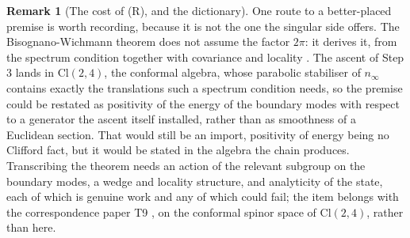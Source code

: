\documentclass[11pt]{article}
\theoremstyle{definition}
\newtheorem{remark}[theorem]{Remark}
\theoremstyle{plain}
\providecommand{\Cl}{}\renewcommand{\Cl}{\mathrm{Cl}}
\providecommand{\nInf}{}\renewcommand{\nInf}{n_\infty}
\begin{document}
\begin{remark}[The cost of (R), and the dictionary]
One route to a better-placed premise is worth recording, because it is not the one the singular side offers. The Bisognano-Wichmann theorem does not assume the factor $2\pi$: it derives it, from the spectrum condition together with covariance and locality \cite{BW1976, Sewell1982}. The ascent of Step 3 lands in $\Cl(2,4)$, the conformal algebra, whose parabolic stabiliser of $\nInf$ contains exactly the translations such a spectrum condition needs, so the premise could be restated as positivity of the energy of the boundary modes with respect to a generator the ascent itself installed, rather than as smoothness of a Euclidean section. That would still be an import, positivity of energy being no Clifford fact, but it would be stated in the algebra the chain produces. Transcribing the theorem needs an action of the relevant subgroup on the boundary modes, a wedge and locality structure, and analyticity of the state, each of which is genuine work and any of which could fail; the item belongs with the correspondence paper T9 \cite{ButlerT9}, on the conformal spinor space of $\Cl(2,4)$, rather than here.
\end{remark}
\end{document}
